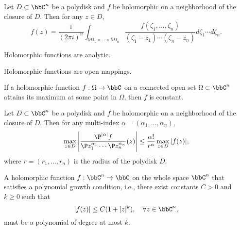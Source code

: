     \begin{theorem}\label{thm:Cauchy_Integral_Formula_in_several_complex_variables}
        Let \(D \subset \bbC^n\) be a polydisk and \(f\) be holomorphic on a neighborhood of the closure of \(D\). Then for any \(z \in D\),
        \[ f(z) = \frac{1}{(2\pi i)^n} \int_{\partial D_1 \times \cdots \times \partial D_n} \frac{f(\zeta_1, \ldots, \zeta_n)}{(\zeta_1 - z_1) \cdots (\zeta_n - z_n)} d\zeta_1 \cdots d\zeta_n. \]
    \end{theorem}

    \begin{corollary}\label{cor:holomorphic_functions_are_analytic}
        Holomorphic functions are analytic.
    \end{corollary}

    \begin{proposition}\label{prop:open_mapping_theorem}
        Holomorphic functions are open mappings.
    \end{proposition}

    \begin{proposition}\label{prop:rigidity_of_holomorphic_functions}
        If a holomorphic function \(f: \Omega \to \bbC\) on a connected open set \(\Omega \subset \bbC^n\) attains its maximum at some point in \(\Omega\), then \(f\) is constant.
    \end{proposition}

    \begin{proposition}\label{prop:Cauchy_estimates}
        Let \(D \subset \bbC^n\) be a polydisk and \(f\) be holomorphic on a neighborhood of the closure of \(D\). Then for any multi-index \(\alpha = (\alpha_1, \ldots, \alpha_n)\),
        \[ \max_{z \in D} \left| \frac{\P^{|\alpha|} f}{\P z_1^{\alpha_1} \cdots \P z_n^{\alpha_n}}(z) \right| \leq \frac{\alpha!}{r^\alpha} \max_{z \in D} |f(z)|, \]
        where \(r = (r_1, \ldots, r_n)\) is the radius of the polydisk \(D\).
    \end{proposition}

    \begin{theorem}\label{thm:generalized_Liouville_Theorem}
        A holomorphic function \(f: \bbC^n \to \bbC\) on the whole space \(\bbC^n\) that satisfies a polynomial growth condition, i.e., there exist constants \(C > 0\) and \(k \geq 0\) such that 
        \[ |f(z)| \leq C(1 + |z|^k), \quad \forall z \in \bbC^n, \]
        must be a polynomial of degree at most \(k\).
    \end{theorem}

